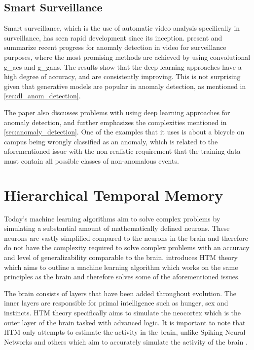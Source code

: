 \subsection{Smart Surveillance}
Smart surveillance, which is the use of automatic video analysis specifically in surveillance, has seen rapid development since its inception. \textcite{anomalyvideo} present and summarize recent progress for anomaly detection in video for surveillance purposes, where the most promising methods are achieved by using convolutional \glspl*{g_ae} and \glspl*{g_gan}. The results show that the deep learning approaches have a high degree of accuracy, and are consistently improving. This is not surprising given that generative models are popular in anomaly detection, as mentioned in \autoref{sec:dl_anom_detection}.
\par
The paper also discusses problems with using deep learning approaches for anomaly detection, and further emphasizes the complexities mentioned in \autoref{sec:anomaly_detection}. One of the examples that it uses is about a bicycle on campus being wrongly classified as an anomaly, which is related to the aforementioned issue with the non-realistic requirement that the training data must contain all possible classes of non-anomalous events.

\section{Hierarchical Temporal Memory}
Today's machine learning algorithms aim to solve complex problems by simulating a substantial amount of mathematically defined neurons. These neurons are vastly simplified compared to the neurons in the brain and therefore do not have the complexity required to solve complex problems with an accuracy and level of generalizability comparable to the brain. \textcite{BAMI} introduces HTM theory which aims to outline a machine learning algorithm which works on the same principles as the brain and therefore solves some of the aforementioned issues.\par
The brain consists of layers that have been added throughout evolution. The inner layers are responsible for primal intelligence such as hunger, sex and instincts. HTM theory specifically aims to simulate the neocortex which is the outer layer of the brain tasked with advanced logic. It is important to note that HTM only attempts to estimate the activity in the brain, unlike Spiking Neural Networks and others which aim to accurately simulate the activity of the brain \cite{spiking_neural_networks}.
